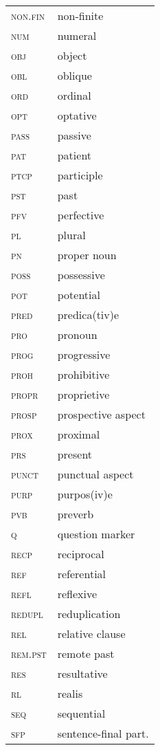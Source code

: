 \begin{multicols}{2}
\begin{tabular}{lp{4cm}@{}} 
\textsc{non}.\textsc{fin}&non-finite\\
\textsc{num}&numeral\\
\textsc{obj} & object\\
\textsc{obl}&oblique\\
\textsc{ord} & ordinal\\
\textsc{opt}&optative\\
\textsc{pass}&passive\\
\textsc{pat}&patient\\
\textsc{ptcp}&participle\\
\textsc{pst}&past\\
\textsc{pfv}&perfective\\
\textsc{pl} & plural\\
\textsc{pn} & proper noun\\
\textsc{poss} &possessive\\
\textsc{pot}&potential\\
\textsc{pred}& predica(tiv)e\\
\textsc{pro}&pronoun\\
\textsc{prog}&progressive\\
\textsc{proh}&prohibitive\\
\textsc{propr}&proprietive\\
\textsc{prosp}&prospective aspect\\
\textsc{prox}&proximal\\
\textsc{prs}&present\\
\textsc{punct}&punctual aspect\\
\textsc{purp}&purpos(iv)e\\
\textsc{pvb}&preverb\\
\textsc{q}&question marker\\
\textsc{recp}&reciprocal\\
\textsc{ref}&referential\\
\textsc{refl}&reflexive\\
\textsc{redupl}&reduplication\\
\textsc{rel}&relative clause\\
\textsc{rem}.\textsc{pst}&remote past\\
\textsc{res}&resultative\\
\textsc{rl}&realis\\
\textsc{seq}&sequential\\
\textsc{sfp}&sentence-final part.\\
\end{tabular}


\end{multicols}
